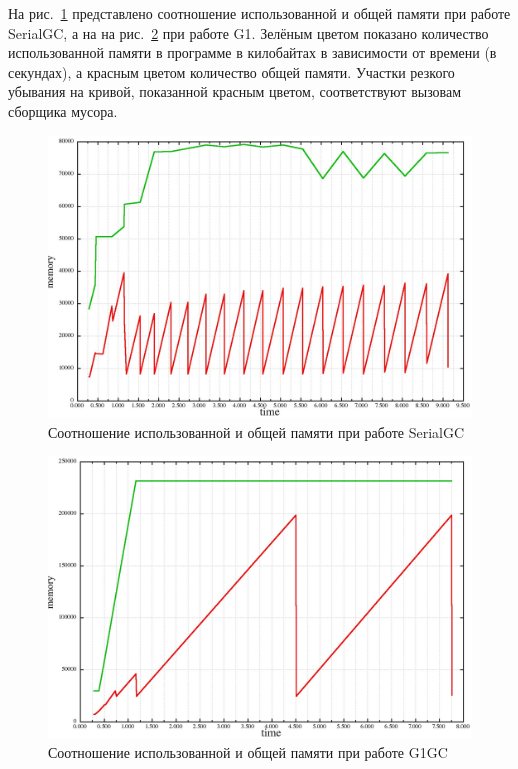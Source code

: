 На рис.~\ref{pic:serialmem} представлено соотношение использованной и общей памяти
при работе SerialGC, а на на рис.~\ref{pic:g1mem} при работе G1. Зелёным цветом показано
количество использованной памяти в программе в килобайтах в зависимости от времени (в секундах),
а красным цветом количество общей памяти. Участки резкого убывания на кривой, показанной красным цветом,
соответствуют вызовам сборщика мусора.

\begin{figure}
\caption{\label{pic:serialmem}Соотношение использованной и общей памяти при работе SerialGC}
\includegraphics[width=1\linewidth]{Bakradze/serialmem.jpg}
\end{figure}


\begin{figure}
\centering
\caption{\label{pic:g1mem}Соотношение использованной и общей памяти при работе G1GC}
\includegraphics[width=1\linewidth]{Bakradze/g1mem.jpg}
\end{figure}

